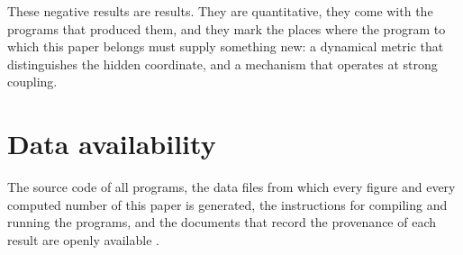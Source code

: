 These negative results are results. They are quantitative, they come with the programs that
produced them, and they mark the places where the program to which this paper belongs must supply
something new: a dynamical metric that distinguishes the hidden coordinate, and a mechanism that
operates at strong coupling.

\section*{Data availability}

The source code of all programs, the data files from which every figure and every computed number of
this paper is generated, the instructions for compiling and running the programs, and the documents
that record the provenance of each result are openly available \cite{SpacetimesRepo}.
